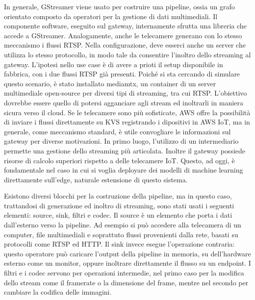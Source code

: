 In generale, GStreamer viene usato per costruire una pipeline, ossia un grafo orientato composto da operatori per la gestione di dati multimediali. Il componente software, eseguito sul gateway, internamente sfrutta una libreria che accede a GStreamer. %
Analogamente, anche le telecamere generano con lo stesso meccanismo i flussi RTSP. Nella configurazione, deve esserci anche un server che utilizza lo stesso protocollo, in modo tale da consentire l'inoltro dello streaming al gateway. L'ipotesi nello use case è di avere a prioti il setup disponibile in fabbrica, con i due flussi RTSP già presenti. Poiché si sta cercando di simulare questo scenario, è stato installato mediamtx, un container di un server multimediale open-source per diversi tipi di streaming, tra cui RTSP. L'obiettivo dovrebbe essere quello di potersi agganciare agli stream ed inoltrarli in maniera sicura verso il cloud. Se le telecamere sono più sofisticate, AWS offre la possibilità di inviare i flussi direttamente su KVS registrando i dipositivi in AWS IoT, ma in generale, come meccanismo standard, è utile convogliare le informazioni sul gateway per diverse motivazioni. In primo luogo, l'utilizzo di un intermediario permette una gestione dello streaming più articolata. Inoltre il gateway possiede risorse di calcolo superiori rispetto a delle telecamere IoT. Questo, ad oggi, è fondamentale nel caso in cui si voglia deployare dei modelli di machine learning direttamente sull'edge, naturale estensione di questo sistema.

Esistono diversi blocchi per la costruzione della pipeline, ma in questo caso, trattandosi di generazione ed inoltro di streaming, sono stati usati i seguenti elementi: source, sink, filtri e codec. Il source è un elemento che porta i dati dall'esterno verso la pipeline. Ad esempio si può accedere alla telecamera di un computer, file multimediali e soprattuto flussi provenienti dalla rete, basati su protocolli come RTSP ed HTTP. Il sink invece esegue l'operazione contraria: questo operatore può caricare l'output della pipeline in memoria, su dell'hardware esterno come un monitor, oppure inoltrare direttamente il flusso su un endpoint. I filtri e i codec servono per operazioni intermedie, nel primo caso per la modifica dello stream come il framerate o la dimensione del frame, mentre nel secondo per cambiare la codifica delle immagini. 


